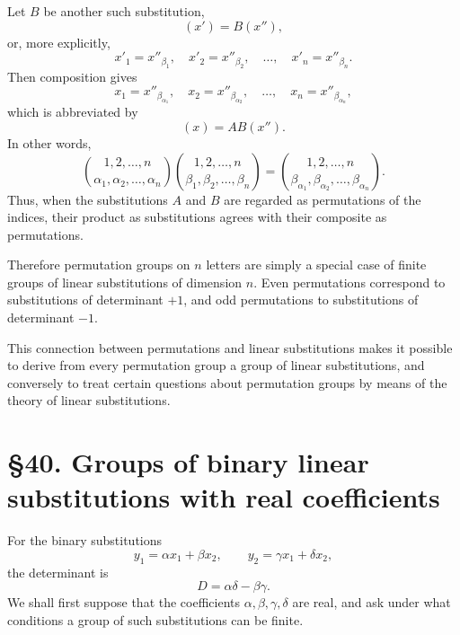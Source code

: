 \documentclass[11pt,a4paper]{book}
\newcommand{\webersection}[2]{\clearpage\section*{\S #1. #2}}
\begin{document}
Let $B$ be another such substitution,
\begin{equation}\label{eq:weber8-perm-second}
(x')=B(x''),
\end{equation}
or, more explicitly,
\begin{equation}\label{eq:weber8-perm-second-coords}
x'_1=x''_{\beta_1},\quad x'_2=x''_{\beta_2},\quad\ldots,\quad x'_n=x''_{\beta_n}.
\end{equation}
Then composition gives
\begin{equation}\label{eq:weber8-perm-compose-coords}
x_1=x''_{\beta_{\alpha_1}},\quad x_2=x''_{\beta_{\alpha_2}},\quad\ldots,\quad x_n=x''_{\beta_{\alpha_n}},
\end{equation}
which is abbreviated by
\begin{equation}\label{eq:weber8-perm-compose}
(x)=AB(x'').
\end{equation}
In other words,
\begin{equation}\label{eq:weber8-perm-product}
\binom{1,2,\ldots,n}{\alpha_1,\alpha_2,\ldots,\alpha_n}
\binom{1,2,\ldots,n}{\beta_1,\beta_2,\ldots,\beta_n}
=
\binom{1,2,\ldots,n}{\beta_{\alpha_1},\beta_{\alpha_2},\ldots,\beta_{\alpha_n}}.
\end{equation}
Thus, when the substitutions $A$ and $B$ are regarded as permutations of the indices, their product as substitutions agrees with their composite as permutations.

Therefore permutation groups on $n$ letters are simply a special case of finite groups of linear substitutions of dimension $n$.  Even permutations correspond to substitutions of determinant $+1$, and odd permutations to substitutions of determinant $-1$.

This connection between permutations and linear substitutions makes it possible to derive from every permutation group a group of linear substitutions, and conversely to treat certain questions about permutation groups by means of the theory of linear substitutions.

\webersection{40}{Groups of binary linear substitutions with real coefficients}

For the binary substitutions
\begin{equation}
 y_1=\alpha x_1+\beta x_2,\qquad
 y_2=\gamma x_1+\delta x_2,
\end{equation}
the determinant is
\[
D=\alpha\delta-\beta\gamma .
\]
We shall first suppose that the coefficients
\(\alpha,\beta,\gamma,\delta\) are real, and ask under what conditions a group of such substitutions can be finite.
\end{document}

